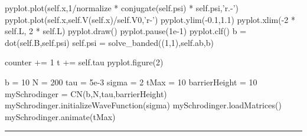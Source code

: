\begin{codeexample}
\begin{VerbatimOut}{\listingFile}
                pyplot.plot(self.x,1/normalize * conjugate(self.psi) * self.psi,'r.-')
                pyplot.plot(self.x,self.V(self.x)/self.V0,'r-')
                pyplot.ylim(-0.1,1.1)
                pyplot.xlim(-2 * self.L, 2 * self.L)
                pyplot.draw()
                pyplot.pause(1e-1)
                pyplot.clf()
            b = dot(self.B,self.psi)
            self.psi = solve_banded((1,1),self.ab,b)

            counter += 1
            t += self.tau
        pyplot.figure(2)

b = 10
N = 200
tau = 5e-3
sigma = 2
tMax = 10
barrierHeight = 10
mySchrodinger = CN(b,N,tau,barrierHeight)
mySchrodinger.initializeWaveFunction(sigma)
mySchrodinger.loadMatrices()
mySchrodinger.animate(tMax)



\end{VerbatimOut}
\end{codeexample}
\else
\noindent\rule{5 in}{0.01 in}
\fi
